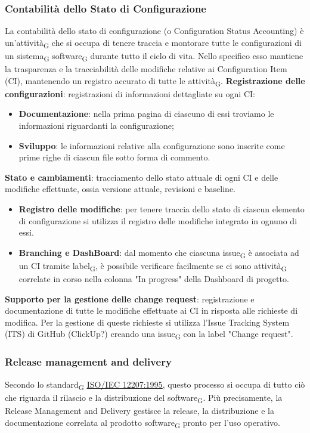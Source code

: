 {{\subsubsection{Contabilità dello Stato di Configurazione}
La contabilità dello stato di configurazione (o Configuration Status Accounting) è un'{attività\textsubscript{G}} 
che si occupa di tenere traccia e montorare tutte le configurazioni di un {sistema\textsubscript{G}} {software\textsubscript{G}}
durante tutto il ciclo di vita. Nello specifico esso mantiene la trasparenza e la tracciabilità delle modifiche relative ai Configuration Item (CI),
mantenendo un registro accurato di tutte le {attività\textsubscript{G}}.
\textbf{Registrazione delle configurazioni}: registrazioni di informazioni dettagliate su ogni CI:
\begin{itemize}
    \item \textbf{Documentazione}: nella prima pagina di ciascuno di essi troviamo le informazioni riguardanti la configurazione;
    \item \textbf{Sviluppo}: le informazioni relative alla configurazione sono inserite come prime
    righe di ciascun file sotto forma di commento.
\end{itemize}
\textbf{Stato e cambiamenti}: tracciamento dello stato attuale di ogni CI e delle modifiche effettuate, ossia versione attuale, revisioni e baseline.
\begin{itemize}
    \item \textbf{Registro delle modifiche}: per tenere traccia dello stato di ciascun elemento di configurazione si utilizza il registro
    delle modifiche integrato in ognuno di essi.
    \item \textbf{Branching e DashBoard}: dal momento che ciascuna {issue\textsubscript{G}} è associata ad un CI tramite
    {label\textsubscript{G}}, è possibile verificare facilmente se ci sono {attività\textsubscript{G}} correlate
    in corso nella colonna "In progress" della Dashboard di progetto.
\end{itemize}
\textbf{Supporto per la gestione delle change request}: registrazione e documentazione di tutte le modifiche effettuate ai CI in risposta alle
richieste di modifica. Per la gestione di queste richieste si utilizza l'Issue Tracking System (ITS) di GitHub (ClickUp?) creando una
{issue\textsubscript{G}} con la label "Change request".

\subsubsection{Release management and delivery}
Secondo lo {standard\textsubscript{G}} \href{https://www.math.unipd.it/~tullio/IS-1/2009/Approfondimenti/ISO_12207-1995.pdf}{\underline{ISO/IEC 12207:1995}},
questo processo si occupa di tutto ciò che riguarda il rilascio e la distribuzione del {software\textsubscript{G}}. Più precisamente,
la Release Management and Delivery gestisce la release, la distribuzione e la documentazione correlata al prodotto {software\textsubscript{G}}
pronto per l'uso operativo.

}}

